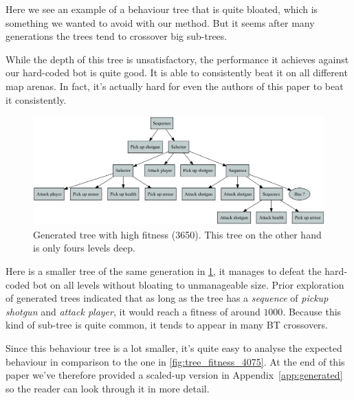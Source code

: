 \documentclass[a4paper, twocolumn]{article}
\begin{document}
        Here we see an example of a behaviour tree that is quite bloated, which is something we wanted to avoid with our method. But it seems after many generations the trees tend to crossover big sub-trees.

        While the depth of this tree is unsatisfactory, the performance it achieves against our hard-coded bot is quite good. It is able to consistently beat it on all different map arenas. In fact, it's actually hard for even the authors of this paper to beat it consistently.

        \begin{figure}[H]
            \centering
            \includegraphics[width=\linewidth]{share/tree-fitness-3780.png}
            \caption{Generated tree with high fitness (3650). This tree on the other hand is only fours levels deep.}
            \label{fig:tree_fitness_3650}
        \end{figure}
        Here is a smaller tree of the same generation in \cref{fig:tree_fitness_3650}, it manages to defeat the hard-coded bot on all levels without bloating to unmanageable size. Prior exploration of generated trees indicated that as long as the tree has a \textit{sequence} of \textit{pickup shotgun} and \textit{attack player}, it would reach a fitness of around \(1000\). Because this kind of sub-tree is quite common, it tends to appear in many BT crossovers.

        Since this behaviour tree is a lot smaller, it's quite easy to analyse the expected behaviour in comparison to the one in \cref{fig:tree_fitness_4075}. At the end of this paper we've therefore provided a scaled-up version in Appendix~\ref{app:generated} so the reader can look through it in more detail.
\end{document}

